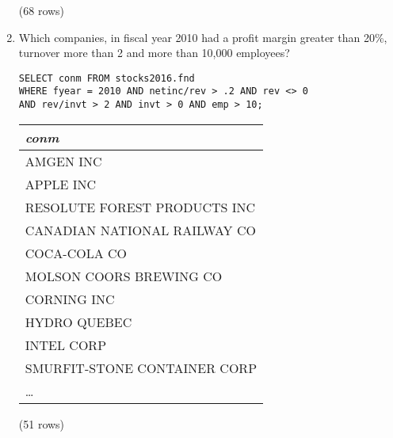 \documentclass[]{article}
\newenvironment{question}[2][Question]{\begin{trivlist}
\item[\hskip \labelsep {\bfseries #1}\hskip \labelsep {\bfseries #2.}]}{\end{trivlist}}
\begin{document}
\begin{question}{2}
\begin{enumerate}[label=(\alph*)]
\begin{center}
\noindent (68 rows) \\
\end{center}

\item Which companies, in fiscal year 2010 had a profit margin greater than 20\%, turnover more than 2 and more than 10,000 employees?
  \color{blue}
\begin{verbatim}
SELECT conm FROM stocks2016.fnd
WHERE fyear = 2010 AND netinc/rev > .2 AND rev <> 0
AND rev/invt > 2 AND invt > 0 AND emp > 10;
  \end{verbatim}
\color{black}

\begin{center}
\begin{tabular}{l}
\textit{conm} \\
\hline
AMGEN INC \\
APPLE INC \\
RESOLUTE FOREST PRODUCTS INC \\
CANADIAN NATIONAL RAILWAY CO \\
COCA-COLA CO \\
MOLSON COORS BREWING CO \\
CORNING INC \\
HYDRO QUEBEC \\
INTEL CORP \\
SMURFIT-STONE CONTAINER CORP \\
\ldots \\
\end{tabular}

\noindent (51 rows) \\
\end{center}

\end{enumerate}
\end{question}
\end{document}
